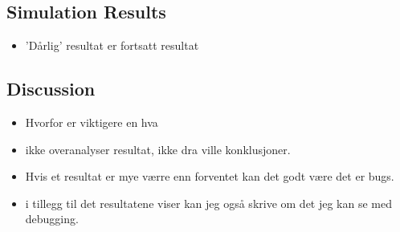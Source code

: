 \subsection{Simulation Results}
\begin{itemize}
    \item 'Dårlig' resultat er fortsatt resultat
\end{itemize}



\subsection{Discussion}
\begin{itemize}
    \item Hvorfor er viktigere en hva
    \item ikke overanalyser resultat, ikke dra ville konklusjoner.
    \item Hvis et resultat er mye værre enn forventet kan det godt være det er bugs.
    \item i tillegg til det resultatene viser kan jeg også skrive om det jeg kan se med debugging.
\end{itemize}

